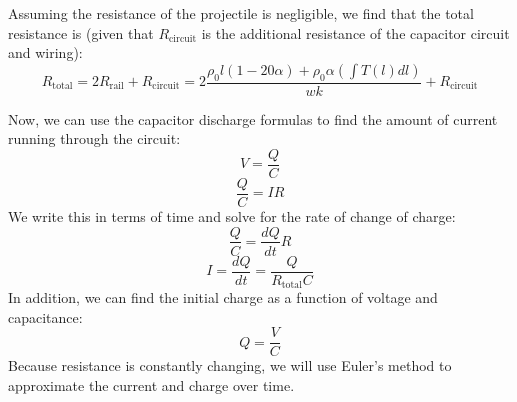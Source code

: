 \documentclass[12pt]{article}
\begin{document}
Assuming the resistance of the projectile is negligible, we find that the total resistance is (given that $R_{\text{circuit}}$ is the additional resistance of the capacitor circuit and wiring):
\begin{equation}
R_{\text{total}} = 2R_{\text{rail}} + R_{\text{circuit}} = 2\frac{\rho_{0}l(1 - 20\alpha) + \rho_{0}\alpha (\int T(l) dl)}{wk} + R_{\text{circuit}}
\label{eqn:eqn3}
\end{equation}

Now, we can use the capacitor discharge formulas to find the amount of current running through the circuit:
\begin{equation}
    V = \frac{Q}{C}
\end{equation}
\begin{equation}
    \frac{Q}{C} = IR
\end{equation}
We write this in terms of time and solve for the rate of change of charge:
\begin{equation}
    \frac{Q}{C} = \frac{dQ}{dt} R
\end{equation}
\begin{equation}
    I = \frac{dQ}{dt} = \frac{Q}{R_{\text{total}}C}
    \label{eqn:eqn4}
\end{equation}
In addition, we can find the initial charge as a function of voltage and capacitance:
\begin{equation}
    Q = \frac{V}{C}
    \label{eqn:eqn5}
\end{equation}
Because resistance is constantly changing, we will use Euler's method to approximate the current and charge over time.
\end{document}
